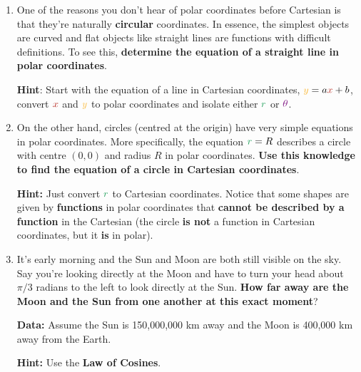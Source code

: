 \documentclass[a4paper,11pt]{article}
\newcommand{\clr}{\textcolor{BrickRed}}
\newcommand{\clg}{\textcolor{ForestGreen}}
\newcommand{\clm}{\textcolor{Fuchsia}}
\newcommand{\cly}{\textcolor{Dandelion}}
\begin{document}
\begin{enumerate}
 \item One of the reasons you don't hear of polar coordinates before Cartesian
  is that they're naturally \textbf{circular} coordinates. In essence, the
  simplest objects are curved and flat objects like straight lines are functions
  with difficult definitions. To see this, \textbf{determine the equation of a
  straight line in polar coordinates}.
 
  \textbf{Hint}: Start with the equation of a line in Cartesian coordinates,
  $\cly{y} = a \clr{x} + b$, convert $\clr{x}$ and $\cly{y}$ to polar
  coordinates and isolate either $\clg{r}$ or $\clm{\theta}$.
 \item On the other hand, circles (centred at the origin) have very simple
  equations in polar coordinates. More specifically, the equation $\clg{r} = R$
  describes a circle with centre $(0,0)$ and radius $R$ in polar coordinates.
  \textbf{Use this knowledge to find the equation of a circle in Cartesian
  coordinates}.
 
  \textbf{Hint:} Just convert $\clg{r}$ to Cartesian coordinates. Notice that
  some shapes are given by \textbf{functions} in polar coordinates that
  \textbf{cannot be described by a function} in the Cartesian (the circle
  \textbf{is not} a function in Cartesian coordinates, but it \textbf{is} in
  polar).
 \item It's early morning and the Sun and Moon are both still visible on the
  sky. Say you're looking directly at the Moon and have to turn your head about
  $\pi / 3$ radians to the left to look directly at the Sun. \textbf{How far
  away are the Moon and the Sun from one another at this exact moment}?
 
  \textbf{Data:} Assume the Sun is 150,000,000 km away and the Moon is 400,000
  km away from the Earth.
 
  \textbf{Hint:} Use the \textbf{Law of Cosines}.
  \begin{center}
\end{center}
\end{enumerate}
\end{document}
